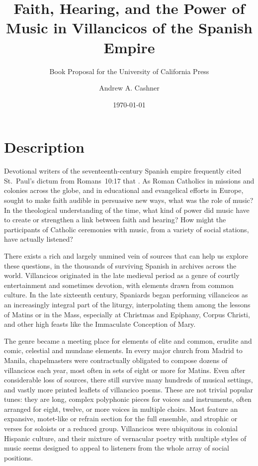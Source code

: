 \documentclass{vcbook-proposal}
\newcommand{\publisher}{the University of California Press}
\begin{document}
\frontmatter

\begin{titlingpage}
\title    {Faith, Hearing, and the Power of Music 
           in Villancicos of the Spanish Empire}
\subtitle {Book Proposal for \publisher}
\author   {Andrew A. Cashner}
\date     {\today}
\maketitle
\end{titlingpage}

\tableofcontents*

\mainmatter

\section{Description}

Devotional writers of the seventeenth-century Spanish empire frequently cited St.~Paul's dictum from Romans~10:17 that .
As Roman Catholics in missions and colonies across the globe, and in educational and evangelical efforts in Europe, sought to make faith audible in persuasive new ways, what was the role of music?
In the theological understanding of the time, what kind of power did music have to create or strengthen a link between faith and hearing?
How might the participants of Catholic ceremonies with music, from a variety of social stations, have actually listened?

There exists a rich and largely unmined vein of sources that can help us explore these questions, in the thousands of surviving Spanish  in archives across the world.
Villancicos originated in the late medieval period as a genre of courtly entertainment and sometimes devotion, with elements drawn from common culture.
In the late sixteenth century, Spaniards began performing villancicos as an increasingly integral part of the liturgy, interpolating them among the lessons of Matins or in the Mass, especially at Christmas and Epiphany, Corpus Christi, and other high feasts like the Immaculate Conception of Mary.

The genre became a meeting place for elements of elite and common, erudite and comic, celestial and mundane elements.
In every major church from Madrid to Manila, chapelmasters were contractually obligated to compose dozens of villancicos each year, most often in sets of eight or more for Matins.
Even after considerable loss of sources, there still survive many hundreds of musical settings, and vastly more printed leaflets of villancico poems. 
These are not trivial popular tunes: they are long, complex polyphonic pieces for voices and instruments, often arranged for eight, twelve, or more voices in multiple choirs.
Most feature an expansive, motet-like  or refrain section for the full ensemble, and strophic  or verses for soloists or a reduced group.
Villancicos were ubiquitous in colonial Hispanic culture, and their mixture of vernacular poetry with multiple styles of music seems designed to appeal to listeners from the whole array of social positions.
\end{document}
